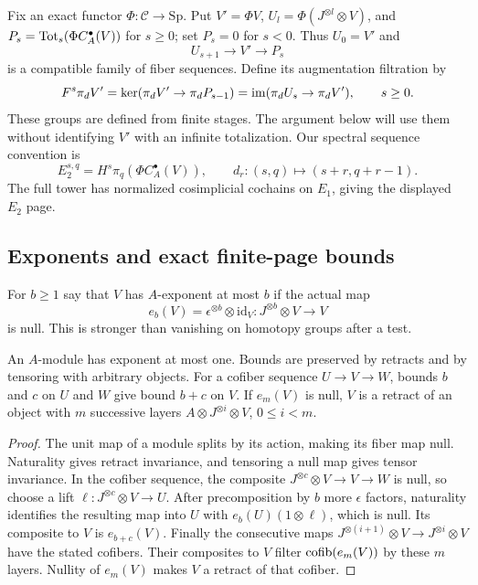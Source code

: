 Fix an exact functor $\Phi:\mathcal C\to\mathrm{Sp}$. Put
$V'=\Phi V$, $U_l=\Phi(J^{\otimes l}\otimes V)$, and
$P_s=\operatorname{Tot}_s(\Phi C_A^\bullet(V))$ for $s\geq0$; set $P_s=0$
for $s<0$. Thus $U_0=V'$ and
\begin{equation}\label{eq:finite-fiber}
 U_{s+1}\longrightarrow V'\longrightarrow P_s
\end{equation}
is a compatible family of fiber sequences. Define its augmentation
filtration by
\begin{equation}\label{eq:augmentation-filtration}
 F^s\pi_dV'=\ker(\pi_dV'\to\pi_dP_{s-1})
           =\operatorname{im}(\pi_dU_s\to\pi_dV'),\qquad s\geq0.
\end{equation}
These groups are defined from finite stages. The argument below will
use them without identifying $V'$ with an infinite totalization.
Our spectral sequence convention is
\[
 E_2^{s,q}=H^s\pi_q(\Phi C_A^\bullet(V)),\qquad
 d_r:(s,q)\longmapsto(s+r,q+r-1).
\]
The full tower has normalized cosimplicial cochains on $E_1$, giving the
displayed $E_2$ page.

\subsection{Exponents and exact finite-page bounds}\label{sec:exponent-pages}
For $b\geq1$ say that $V$ has $A$-exponent at most $b$ if the actual map
\[
 e_b(V)=\epsilon^{\otimes b}\otimes\mathrm{id}_V:
 J^{\otimes b}\otimes V\longrightarrow V
\]
is null. This is stronger than vanishing on homotopy groups after a test.

\begin{lemma}\label{lem:exponent-calculus}
An $A$-module has exponent at most one. Bounds are preserved by retracts
and by tensoring with arbitrary objects. For a cofiber sequence
$U\to V\to W$, bounds $b$ and $c$ on $U$ and $W$ give bound $b+c$ on $V$.
If $e_m(V)$ is null, $V$ is a retract of an object with $m$ successive
layers $A\otimes J^{\otimes i}\otimes V$, $0\leq i<m$.
\end{lemma}
\begin{proof}
The unit map of a module splits by its action, making its fiber map
null. Naturality gives retract invariance, and tensoring a null map
gives tensor invariance. In the cofiber sequence, the composite
$J^{\otimes c}\otimes V\to V\to W$ is null, so choose a lift
$\ell:J^{\otimes c}\otimes V\to U$. After precomposition by $b$
more $\epsilon$ factors, naturality identifies the resulting map into $U$
with $e_b(U)(1\otimes\ell)$, which is null. Its composite to $V$ is
$e_{b+c}(V)$. Finally the consecutive maps
$J^{\otimes(i+1)}\otimes V\to J^{\otimes i}\otimes V$ have the
stated cofibers. Their composites to $V$ filter $\operatorname{cofib}(e_m(V))$ by
these $m$ layers. Nullity of $e_m(V)$ makes $V$ a retract of that cofiber.
\end{proof}

